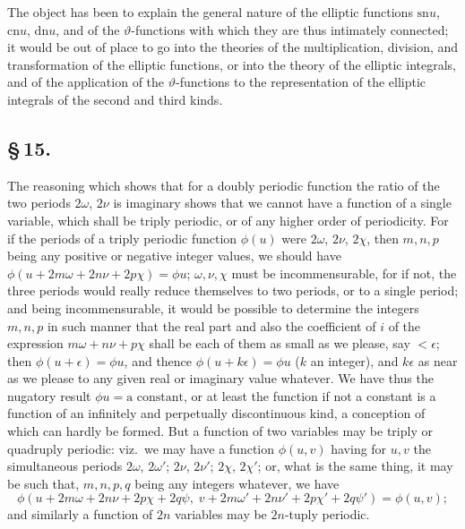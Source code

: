 \documentclass[11pt,a4paper]{book}
\providecommand{\sn}{\mathrm{sn}}
\providecommand{\cn}{\mathrm{cn}}
\providecommand{\dn}{\mathrm{dn}}
\begin{document}
The object has been to explain the general nature of the elliptic functions $\sn u$, $\cn u$, $\dn u$, and of the $\vartheta$-functions with which they are thus intimately connected; it would be out of place to go into the theories of the multiplication, division, and transformation of the elliptic functions, or into the theory of the elliptic integrals, and of the application of the $\vartheta$-functions to the representation of the elliptic integrals of the second and third kinds.

\subsection*{\S\,15.}

The reasoning which shows that for a doubly periodic function the ratio of the two periods $2\omega$, $2\nu$ is imaginary shows that we cannot have a function of a single variable, which shall be triply periodic, or of any higher order of periodicity. For if the periods of a triply periodic function $\phi(u)$ were $2\omega$, $2\nu$, $2\chi$, then $m, n, p$ being any positive or negative integer values, we should have $\phi(u + 2m\omega + 2n\nu + 2p\chi) = \phi u$; $\omega, \nu, \chi$ must be incommensurable, for if not, the three periods would really reduce themselves to two periods, or to a single period; and being incommensurable, it would be possible to determine the integers $m, n, p$ in such manner that the real part and also the coefficient of $i$ of the expression $m\omega + n\nu + p\chi$ shall be each of them as small as we please, say $< \epsilon$; then $\phi(u + \epsilon) = \phi u$, and thence $\phi(u + k\epsilon) = \phi u$ ($k$ an integer), and $k\epsilon$ as near as we please to any given real or imaginary value whatever. We have thus the nugatory result $\phi u = \text{a constant}$, or at least the function if not a constant is a function of an infinitely and perpetually discontinuous kind, a conception of which can hardly be formed. But a function of two variables may be triply or quadruply periodic: viz.\ we may have a function $\phi(u, v)$ having for $u, v$ the simultaneous periods $2\omega$, $2\omega'$; $2\nu$, $2\nu'$; $2\chi$, $2\chi'$; or, what is the same thing, it may be such that, $m, n, p, q$ being any integers whatever, we have
\[
\phi(u + 2m\omega + 2n\nu + 2p\chi + 2q\psi,\; v + 2m\omega' + 2n\nu' + 2p\chi' + 2q\psi') = \phi(u, v);
\]
and similarly a function of $2n$ variables may be $2n$-tuply periodic.
\end{document}
